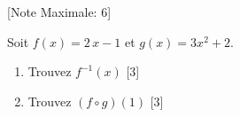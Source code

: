\begin{question}
  \hspace*{\fill} [Note Maximale: 6]\par
  \medskip
  \noindent Soit $f(x) = 2\,x - 1$ et $g(x) = 3x^2 + 2$.\par
  \begin{enumerate}[label=(\alph*)]
    \item Trouvez $f^{-1}(x)$\hspace*{\fill} [3]
    \item Trouvez $(f \circ g)(1)$\hspace*{\fill} [3]
  \end{enumerate}
\end{question}
